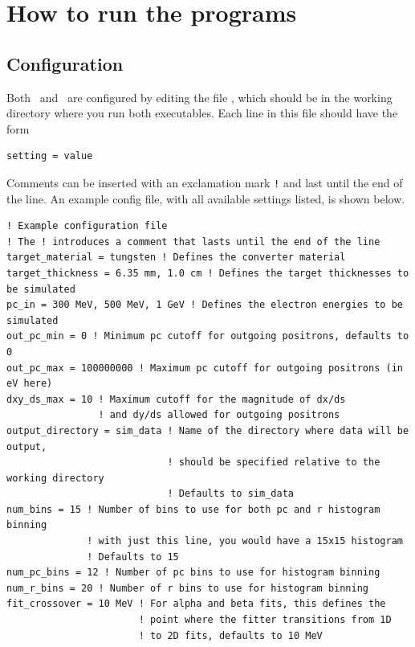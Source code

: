 \documentclass[12pt]{article}
\begin{document}
\section{How to run the programs}

\subsection{Configuration}
Both \exes \, and \exef \, are configured by editing the file \configfile, which should be in the working directory where you run both executables.
Each line in this file should have the form
\begin{verbatim}
setting = value
\end{verbatim}
Comments can be inserted with an exclamation mark \texttt{!} and last until the end of the line.
An example config file, with all available settings listed, is shown below.
\begin{verbatim}
! Example configuration file
! The ! introduces a comment that lasts until the end of the line
target_material = tungsten ! Defines the converter material
target_thickness = 6.35 mm, 1.0 cm ! Defines the target thicknesses to be simulated
pc_in = 300 MeV, 500 MeV, 1 GeV ! Defines the electron energies to be simulated
out_pc_min = 0 ! Minimum pc cutoff for outgoing positrons, defaults to 0
out_pc_max = 100000000 ! Maximum pc cutoff for outgoing positrons (in eV here)
dxy_ds_max = 10 ! Maximum cutoff for the magnitude of dx/ds
                ! and dy/ds allowed for outgoing positrons
output_directory = sim_data ! Name of the directory where data will be output,
                            ! should be specified relative to the working directory
                            ! Defaults to sim_data
num_bins = 15 ! Number of bins to use for both pc and r histogram binning
              ! with just this line, you would have a 15x15 histogram
              ! Defaults to 15
num_pc_bins = 12 ! Number of pc bins to use for histogram binning
num_r_bins = 20 ! Number of r bins to use for histogram binning
fit_crossover = 10 MeV ! For alpha and beta fits, this defines the
                       ! point where the fitter transitions from 1D
                       ! to 2D fits, defaults to 10 MeV
\end{verbatim}
\newcommand{\targetm}{\texttt{target\_material}}
\newcommand{\targett}{\texttt{target\_thickness}}
\newcommand{\pcin}{\texttt{pc\_in}}
\newcommand{\outpcmin}{\texttt{out\_pc\_min}}
\newcommand{\outpcmax}{\texttt{out\_pc\_max}}
\newcommand{\dxydsmax}{\texttt{dxy\_ds\_max}}
\newcommand{\outdir}{\texttt{output\_directory}}
\newcommand{\numbins}{\texttt{num\_bins}}
\newcommand{\numrbins}{\texttt{num\_r\_bins}}
\newcommand{\numpcbins}{\texttt{num\_pc\_bins}}
\newcommand{\fitxpt}{\texttt{fit\_crossover}}
\end{document}
